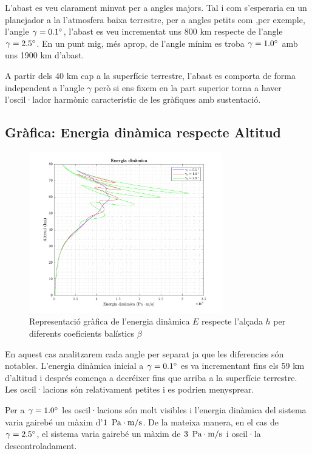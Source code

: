 L'abast es veu clarament minvat per a angles majors. Tal i com s'esperaria en un planejador a la l'atmosfera baixa terrestre, per a angles petits com ,per exemple, l'angle $\gamma = 0.1 \degrees$, l'abast es veu incrementat uns 800 km respecte de l'angle $\gamma = 2.5 \degrees$. En un punt mig, més aprop, de l'angle mínim es troba $\gamma = 1.0 \degrees$ amb uns 1900 km d'abast.

A partir dels 40 km cap a la superfície terrestre, l'abast es comporta de forma independent a l'angle $\gamma$ però si ens fixem en la part superior torna a haver l'oscil·lador harmònic característic de les gràfiques amb sustentació.

\newpage
\subsection{Gràfica: Energia dinàmica respecte Altitud}

\begin{figure}[ht]
    \centering
    \includegraphics[width=0.75\textwidth]{imagenes/02_lifting_graficas/energia_dinamica.pdf}
    \caption{Representació gràfica de l'energia dinàmica $E$ respecte l'alçada $h$ per diferents coeficients balístics $\beta$}
    \label{fig:energia_dinamica_lift}
\end{figure}

En aquest cas analitzarem cada angle per separat ja que les diferencies són notables.
L'energia dinàmica inicial a $\gamma = 0.1 \degrees$ es va incrementant fins els 59 km d'altitud i després comença a decréixer fins que arriba a la superfície terrestre. Les oscil·lacions són relativament petites i es podrien menysprear.

Per a $\gamma = 1.0 \degrees$ les oscil·lacions són molt visibles i l'energia dinàmica del sistema varia gairebé un màxim d'$1 \enskip \pascal \cdot \meter / \second$. De la mateixa manera, en el cas de $\gamma = 2.5 \degrees$, el sistema varia gairebé un màxim de $3 \enskip \pascal \cdot \meter / \second$ i oscil·la descontroladament.








